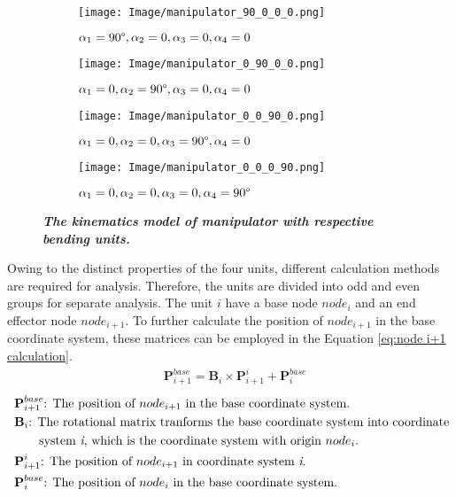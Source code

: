 \begin{figure}[H] %
    \centering %
    \captionsetup{labelsep=colon}
    \begin{subfigure}{0.48\textwidth} %
        \centering
        \texttt{[image: Image/manipulator\_90\_0\_0\_0.png]}
        \caption{$\alpha_1=90 \degree,\alpha_2=0,\alpha_3=0,\alpha_4=0$}
    \end{subfigure}
    \hfill
    \begin{subfigure}{0.48\textwidth} %
        \centering
        \texttt{[image: Image/manipulator\_0\_90\_0\_0.png]}
        \caption{$\alpha_1=0,\alpha_2=90 \degree,\alpha_3=0,\alpha_4=0$}
    \end{subfigure}
    \begin{subfigure}{0.48\textwidth} %
        \centering
        \texttt{[image: Image/manipulator\_0\_0\_90\_0.png]}
        \caption{$\alpha_1=0,\alpha_2=0,\alpha_3=90 \degree,\alpha_4=0$}
    \end{subfigure}
    \hfill
    \begin{subfigure}{0.48\textwidth}
        \centering
        \texttt{[image: Image/manipulator\_0\_0\_0\_90.png]}
        \caption{$\alpha_1=0,\alpha_2=0,\alpha_3=0,\alpha_4=90 \degree$}
    \end{subfigure}
    \caption[The kinematics model of manipulator with respective bending units]
    {\centering \textit{\textbf{The kinematics model of manipulator with respective bending units.}}}
    \label{fig:kinematics_model_resp}
\end{figure}
\noindent Owing to the distinct properties of the four units, different calculation methods are required for analysis. Therefore, 
the units are divided into odd and even groups for separate analysis. The unit $i$ have a base node $node_i$ and an end effector 
node $node_{i+1}$. To further calculate the position of $node_{i+1}$ in the base coordinate system, these matrices can be employed 
in the Equation \ref{eq:node i+1 calculation}.
\begin{align}
    &\textbf{P}_{i+1}^{base} = \textbf{B}_{i} \times \textbf{P}_{i+1}^{i} + \textbf{P}_{i}^{base}
    \label{eq:node i+1 calculation}
\end{align}
\begin{align*}
    &\ \textbf{P}_{i+1}^{base}\text{: The position of $node_{i+1}$ in the base coordinate system.}\\
    &\ \textbf{B}_{i}\text{: The rotational matrix tranforms the base coordinate system into coordinate}\\
    &\ \qquad\text{system \textit{i}, which is the coordinate system with origin $node_i$.}\\
    &\ \textbf{P}_{i+1}^{i}\text{: The position of $node_{i+1}$ in coordinate system \textit{i}.}\\
    &\ \textbf{P}_{i}^{base}\text{: The position of $node_{i}$ in the base coordinate system.}
\end{align*}
